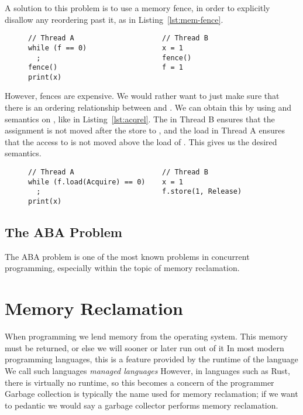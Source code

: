 \documentclass[b5paper]{report}
\begin{document}
A solution to this problem is to use a memory fence, in order to explicitly
disallow any reordering past it, as in Listing~\ref{lst:mem-fence}.

\begin{figure}[ht]
\begin{lstlisting}[caption=Memory fence for synchronization,label=lst:mem-fence]
// Thread A                     // Thread B
while (f == 0)                  x = 1
  ;                             fence()
fence()                         f = 1
print(x)
\end{lstlisting}
\end{figure}
However, fences are expensive. We would rather want to just make sure that
there is an ordering relationship between  and . We can obtain
this by using  and  semantics on , like in
Listing~\ref{lst:acqrel}. The  in Thread B ensures that the
assignment  is not moved after the store to , and the
 load in Thread A ensures that the access to  is not moved
above the load of . This gives us the desired semantics.
\begin{figure}[ht]
\begin{lstlisting}[caption=Synchronization using orderings,label=lst:acqrel]
// Thread A                     // Thread B
while (f.load(Acquire) == 0)    x = 1
  ;                             f.store(1, Release)
print(x)
\end{lstlisting}
\end{figure}


\section{The ABA Problem}
The ABA problem is one of the most known problems in concurrent programming,
especially within the topic of memory reclamation.


\chapter{Memory Reclamation}

When programming we lend memory from the operating system. This memory must be
returned, or else we will sooner or later run out of it In most modern
programming languages, this is a feature provided by the runtime of the
language We call such languages \emph{managed languages} However, in
languages such as Rust, there is virtually no runtime, so this becomes a
concern of the programmer Garbage collection is typically the name used for
memory reclamation; if we want to pedantic we would say a garbage collector
performs memory reclamation.
\end{document}
